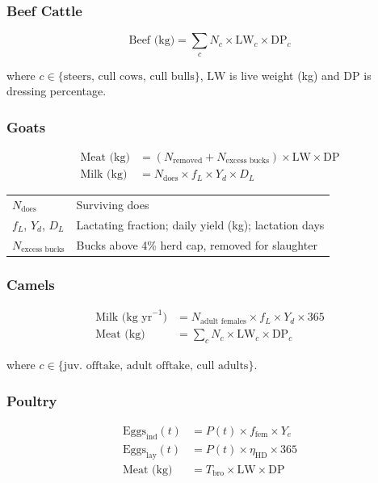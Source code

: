 \subsubsection{Beef Cattle}
\begin{equation}
\text{Beef (kg)} = \sum_{c} N_c \times \mathrm{LW}_c \times \mathrm{DP}_c
\end{equation}

where $c \in \{\text{steers, cull cows, cull bulls}\}$, $\mathrm{LW}$ is live weight (kg) and $\mathrm{DP}$ is dressing percentage.

\subsubsection{Goats}
\begin{align}
\text{Meat (kg)} &= (N_{\text{removed}} + N_{\text{excess bucks}}) \times \mathrm{LW} \times \mathrm{DP} \\[2pt]
\text{Milk (kg)} &= N_{\text{does}} \times f_L \times Y_d \times D_L
\end{align}

{\small
\begin{tabular}{@{}p{}@{\;}p{}@{}}
$N_{\text{does}}$         & Surviving does \\
$f_L$, $Y_d$, $D_L$       & Lactating fraction; daily yield (kg); lactation days \\
$N_{\text{excess bucks}}$ & Bucks above 4\% herd cap, removed for slaughter \\
\end{tabular}}

\subsubsection{Camels}
\begin{align}
\text{Milk (kg yr}^{-1}) &= N_{\text{adult females}} \times f_L \times Y_d \times 365 \\[2pt]
\text{Meat (kg)}         &= \sum_{c} N_c \times \mathrm{LW}_c \times \mathrm{DP}_c
\end{align}

where $c \in \{\text{juv.\ offtake, adult offtake, cull adults}\}$.

\subsubsection{Poultry}
\begin{align}
\text{Eggs}_{\mathrm{ind}}(t) &= P(t) \times f_{\mathrm{fem}} \times Y_e \\
\text{Eggs}_{\mathrm{lay}}(t) &= P(t) \times \eta_{\mathrm{HD}} \times 365 \\
\text{Meat (kg)}              &= T_{\mathrm{bro}} \times \mathrm{LW} \times \mathrm{DP}
\end{align}

